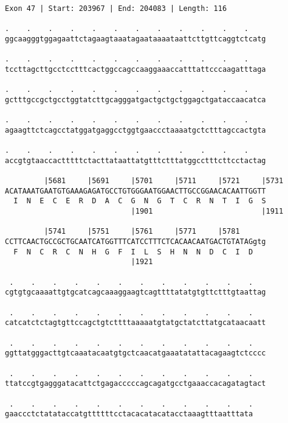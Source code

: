 \documentclass{article}
\begin{document}
\begin{Verbatim}[fontfamily=courier]
Exon 47 | Start: 203967 | End: 204083 | Length: 116

.    .    .    .    .    .    .    .    .    .    .    .    
ggcaagggtggagaattctagaagtaaatagaataaaataattcttgttcaggtctcatg

.    .    .    .    .    .    .    .    .    .    .    .    
tccttagcttgcctcctttcactggccagccaaggaaaccatttattcccaagatttaga

.    .    .    .    .    .    .    .    .    .    .    .    
gctttgccgctgcctggtatcttgcagggatgactgctgctggagctgataccaacatca

.    .    .    .    .    .    .    .    .    .    .    .    
agaagttctcagcctatggatgaggcctggtgaaccctaaaatgctctttagccactgta

.    .    .    .    .    .    .    .    .    .    .    .    
accgtgtaaccactttttctacttataattatgtttctttatggcctttcttcctactag

         |5681     |5691     |5701     |5711     |5721     |5731
ACATAAATGAATGTGAAAGAGATGCCTGTGGGAATGGAACTTGCCGGAACACAATTGGTT
  I  N  E  C  E  R  D  A  C  G  N  G  T  C  R  N  T  I  G  S
                             |1901                         |1911

         |5741     |5751     |5761     |5771     |5781      
CCTTCAACTGCCGCTGCAATCATGGTTTCATCCTTTCTCACAACAATGACTGTATAGgtg
  F  N  C  R  C  N  H  G  F  I  L  S  H  N  N  D  C  I  D   
                             |1921                          

 .    .    .    .    .    .    .    .    .    .    .    .   
cgtgtgcaaaattgtgcatcagcaaaggaagtcagttttatatgtgttctttgtaattag

 .    .    .    .    .    .    .    .    .    .    .    .   
catcatctctagtgttccagctgtcttttaaaaatgtatgctatcttatgcataacaatt

 .    .    .    .    .    .    .    .    .    .    .    .   
ggttatgggacttgtcaaatacaatgtgctcaacatgaaatatattacagaagtctcccc

 .    .    .    .    .    .    .    .    .    .    .    .   
ttatccgtgagggatacattctgagacccccagcagatgcctgaaaccacagatagtact

 .    .    .    .    .    .    .    .    .    .    .    .
gaaccctctatataccatgttttttcctacacatacatacctaaagtttaatttata
\end{Verbatim}
\newpage
\end{document}
